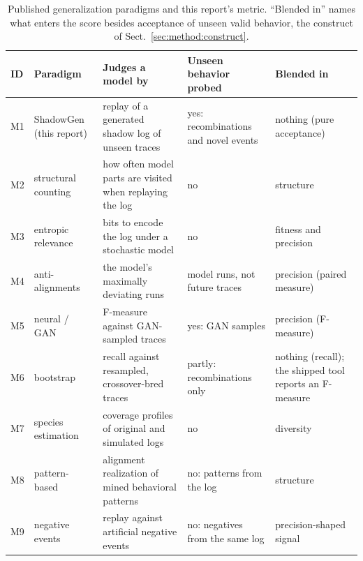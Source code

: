 \documentclass[runningheads]{llncs}
\begin{document}
\begin{table}[t]
\centering
\caption{Published generalization paradigms and this report's metric. ``Blended in'' names what enters the score besides acceptance of unseen valid behavior, the construct of Sect.~\ref{sec:method:construct}.}
\label{tab:paradigms}
\setlength{\tabcolsep}{2.5pt}
\scriptsize
\begin{tabular}{@{}l p{2.25cm} p{3.85cm} p{2.45cm} p{2.45cm}@{}}
\toprule
ID & Paradigm & Judges a model by & Unseen behavior probed & Blended in \\
\midrule
M1 & ShadowGen (this report) & replay of a generated shadow log of unseen traces & yes: recombinations and novel events & nothing (pure acceptance) \\
M2 & structural counting~\cite{buijs2014quality,berti2019pm4py} & how often model parts are visited when replaying the log & no & structure \\
M3 & entropic relevance~\cite{alkhammash2022entropic} & bits to encode the log under a stochastic model & no & fitness and precision \\
M4 & anti-alignments~\cite{vandongen2016anti} & the model's maximally deviating runs & model runs, not future traces & precision (paired measure) \\
M5 & neural / GAN~\cite{theis2020avatar} & F-measure against GAN-sampled traces & yes: GAN samples & precision (F-measure) \\
M6 & bootstrap~\cite{polyvyanyy2022bootstrap} & recall against resampled, crossover-bred traces & partly: recombinations only & nothing (recall); the shipped tool reports an F-measure \\
M7 & species estimation~\cite{kabierski2023species} & coverage profiles of original and simulated logs & no & diversity \\
M8 & pattern-based~\cite{reissner2022pattern} & alignment realization of mined behavioral patterns & no: patterns from the log & structure \\
M9 & negative events~\cite{vandenbroucke2014negative} & replay against artificial negative events & no: negatives from the same log & precision-shaped signal \\
\bottomrule
\end{tabular}
\end{table}
\end{document}
